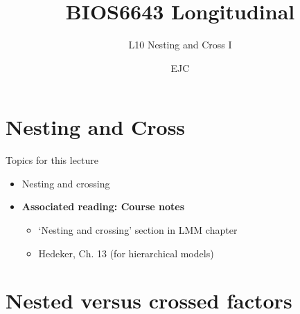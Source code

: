 \documentclass[
  9pt,
  ignorenonframetext,
]{beamer}
\title{BIOS6643 Longitudinal}
\subtitle{L10 Nesting and Cross I}
\author{EJC}
\date{}
\institute{Department of Biostatistics \& Informatics}
\providecommand{\tightlist}{%
  \setlength{\itemsep}{0pt}\setlength{\parskip}{0pt}}
\begin{document}
\frame{\titlepage}

\begin{frame}[allowframebreaks]
  \tableofcontents[hideallsubsections]
\end{frame}
\hypertarget{nesting-and-cross}{%
\section{Nesting and Cross}\label{nesting-and-cross}}

\begin{frame}{Topics for this lecture}
\protect\hypertarget{topics-for-this-lecture}{}
\begin{itemize}
\tightlist
\item
  Nesting and crossing
\end{itemize}

\vspace{\baselineskip}

\begin{itemize}
\item
  \textbf{Associated reading: Course notes}

  \begin{itemize}
  \item
    `Nesting and crossing' section in LMM chapter
  \item
    Hedeker, Ch. 13 (for hierarchical models)
  \end{itemize}
\end{itemize}
\end{frame}

\hypertarget{nested-versus-crossed-factors}{%
\section{Nested versus crossed
factors}\label{nested-versus-crossed-factors}}
\end{document}
